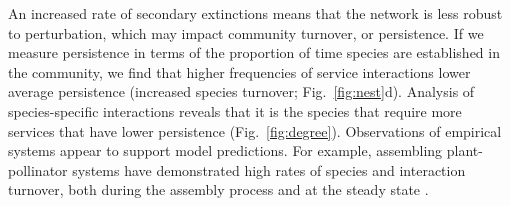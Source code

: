 \documentclass[twocolumn,preprintnumbers,amsmath,amssymb,superscriptaddress,linenumbers]{revtex4-1}
\begin{document}
\begin{bibunit}

An increased rate of secondary extinctions means that the network is less robust to perturbation, which may impact community turnover, or persistence.
If we measure persistence in terms of the proportion of time species are established in the community, we find that higher frequencies of service interactions lower average persistence (increased species turnover; Fig.\ \ref{fig:nest}d).
Analysis of species-specific interactions reveals that it is the species that require more services that have lower persistence (Fig.\ \ref{fig:degree}).
Observations of empirical systems appear to support model predictions.
For example, assembling plant-pollinator systems have demonstrated high rates of species and interaction turnover, both during the assembly process and at the steady state \cite{DiazCastelazo2013}. %



\end{bibunit}
\end{document}
